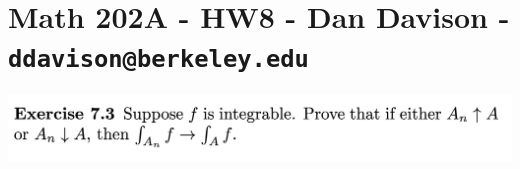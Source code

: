 \section*{Math 202A - HW8 - Dan Davison - \texttt{ddavison@berkeley.edu}}

\begin{mdframed}
\includegraphics[width=400pt]{img/analysis--berkeley-202a-hw08-2798.png}
\end{mdframed}

